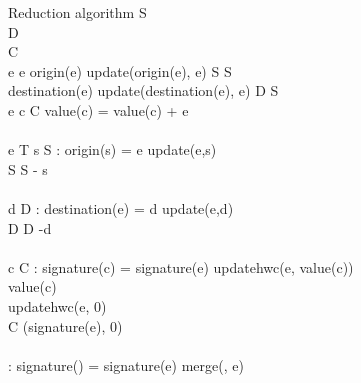 \begin{pseudocode}{Reduction algorithm}{\Sigma}
\label{pc:reduction_phase}
    S \GETS \emptyset \medspace
     \\
    D \GETS \emptyset \medspace
     \\
    C \GETS \emptyset \medspace
     \\
    \FORALL e \in \Sigma \DO 
	\BEGIN 
        \IF e \in \Psi \THEN
        \BEGIN
            \IF origin(e) \in \Omega \THEN
                update(origin(e), e)
            \ELSE
                S \GETS S 
            \\
            \IF destination(e) \in \Omega \THEN
                update(destination(e), e)
            \ELSE
                D \GETS S 
        \END
        \\
        \ELSEIF e \in \Delta \THEN
        \BEGIN
            \FORALL c \in C \DO
                value(c) = value(c) + e\\
        \END
        \\
        \ELSEIF e \in T \THEN
        \BEGIN
            \IF \exists s \in S : origin(s) = e \THEN
            \BEGIN
                update(e,s)\\
                S \GETS S - {s}\\
            \END
            \\
            \IF \exists d \in D : destination(e) = d \THEN
            \BEGIN
                update(e,d)\\
                D \GETS D -{d}\\
            \END
            \\
            \IF \exists c \in C : signature(c) = signature(e)
            \THEN
            \BEGIN
                updatehwc(e, value(c))\\
                value(c) \\
            \END
            \ELSE
            \BEGIN
                updatehwc(e, 0)\\
                C \gets (signature(e), 0)\\
            \END
            \\
            \IF \exists \omega \in \Omega : signature(\omega) = signature(e)
            \THEN
                merge(\omega, e)
            \ELSE
                \Omega \GETS \Omega {}
        \END
	\END
	\\

    \RETURN \Omega
\end{pseudocode}


